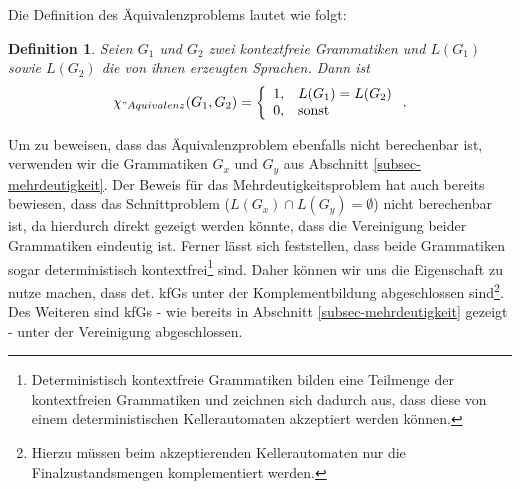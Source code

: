 \documentclass[]{scrartcl}
\newtheorem{definition}{Definition}[section]
\begin{document}
		Die Definition des Äquivalenzproblems lautet wie folgt:
		
		\begin{definition}
			Seien $G_1$ und $G_2$ zwei kontextfreie Grammatiken und $L(G_1)$ sowie $L(G_2)$ die von ihnen erzeugten Sprachen. Dann ist
			\[
				\chi_{"Aquivalenz}(G_1, G_2)=\left\{\begin{array}{ll} 1, & L(G_1) = L(G_2) \\
							         0, &\text{sonst}\end{array}\right. .
			\]
		\end{definition}
		
		Um zu beweisen, dass das Äquivalenzproblem ebenfalls nicht berechenbar ist, verwenden wir die Grammatiken $G_x$ und $G_y$ aus Abschnitt \ref{subsec-mehrdeutigkeit}. Der Beweis für das Mehrdeutigkeitsproblem hat auch bereits bewiesen, dass das Schnittproblem ($L(G_x) \cap L(G_y) = \emptyset$) nicht berechenbar ist, da hierdurch direkt gezeigt werden könnte, dass die Vereinigung beider Grammatiken eindeutig ist. Ferner lässt sich feststellen, dass beide Grammatiken sogar deterministisch kontextfrei\footnote{Deterministisch kontextfreie Grammatiken bilden eine Teilmenge der kontextfreien Grammatiken und zeichnen sich dadurch aus, dass diese von einem deterministischen Kellerautomaten akzeptiert werden können.} sind. Daher können wir uns die Eigenschaft zu nutze machen, dass det. kfGs unter der Komplementbildung abgeschlossen sind\footnote{Hierzu müssen beim akzeptierenden Kellerautomaten nur die Finalzustandsmengen komplementiert werden.}. Des Weiteren sind kfGs - wie bereits in Abschnitt \ref{subsec-mehrdeutigkeit} gezeigt - unter der Vereinigung abgeschlossen.
\end{document}
